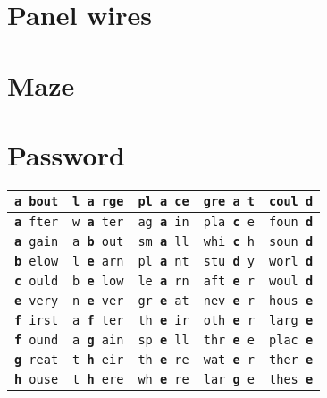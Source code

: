 \documentclass[]{article}
\begin{document}
\section{Panel wires}
\section{Maze}

\newpage
\section{Password}
\begin{tabular}{|l|l|l|l|l|}
\hline \rule[-1ex]{0pt}{3.5ex} \texttt{\textbf{a} bout} & \texttt{l \textbf{a} rge} & \texttt{pl \textbf{a} ce} & \texttt{gre \textbf{a} t} & \texttt{coul \textbf{d}} \\
\hline \rule[-1ex]{0pt}{3.5ex} \texttt{\textbf{a} fter} & \texttt{w \textbf{a} ter} & \texttt{ag \textbf{a} in} & \texttt{pla \textbf{c} e} & \texttt{foun \textbf{d}} \\
\hline \rule[-1ex]{0pt}{3.5ex} \texttt{\textbf{a} gain} & \texttt{a \textbf{b} out} & \texttt{sm \textbf{a} ll} & \texttt{whi \textbf{c} h} & \texttt{soun \textbf{d}} \\
\hline \rule[-1ex]{0pt}{3.5ex} \texttt{\textbf{b} elow} & \texttt{l \textbf{e} arn} & \texttt{pl \textbf{a} nt} & \texttt{stu \textbf{d} y} & \texttt{worl \textbf{d}} \\
\hline \rule[-1ex]{0pt}{3.5ex} \texttt{\textbf{c} ould} & \texttt{b \textbf{e} low} & \texttt{le \textbf{a} rn} & \texttt{aft \textbf{e} r} & \texttt{woul \textbf{d}} \\
\hline \rule[-1ex]{0pt}{3.5ex} \texttt{\textbf{e} very} & \texttt{n \textbf{e} ver} & \texttt{gr \textbf{e} at} & \texttt{nev \textbf{e} r} & \texttt{hous \textbf{e}} \\
\hline \rule[-1ex]{0pt}{3.5ex} \texttt{\textbf{f} irst} & \texttt{a \textbf{f} ter} & \texttt{th \textbf{e} ir} & \texttt{oth \textbf{e} r} & \texttt{larg \textbf{e}} \\
\hline \rule[-1ex]{0pt}{3.5ex} \texttt{\textbf{f} ound} & \texttt{a \textbf{g} ain} & \texttt{sp \textbf{e} ll} & \texttt{thr \textbf{e} e} & \texttt{plac \textbf{e}} \\
\hline \rule[-1ex]{0pt}{3.5ex} \texttt{\textbf{g} reat} & \texttt{t \textbf{h} eir} & \texttt{th \textbf{e} re} & \texttt{wat \textbf{e} r} & \texttt{ther \textbf{e}} \\
\hline \rule[-1ex]{0pt}{3.5ex} \texttt{\textbf{h} ouse} & \texttt{t \textbf{h} ere} & \texttt{wh \textbf{e} re} & \texttt{lar \textbf{g} e} & \texttt{thes \textbf{e}} \\

\end{tabular}
\end{document}

